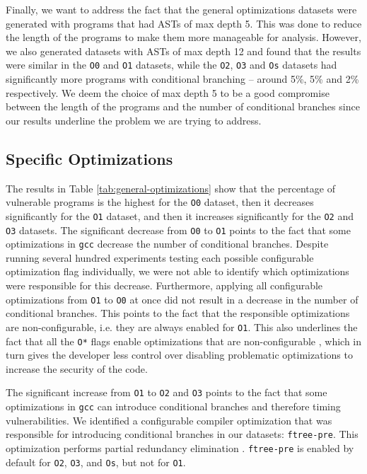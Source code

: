Finally, we want to address the fact that the general optimizations datasets were generated with programs that had ASTs of max depth 5.
This was done to reduce the length of the programs to make them more manageable for analysis.
However, we also generated datasets with ASTs of max depth 12 and found that the results were similar in the \texttt{O0} and \texttt{O1} datasets, while the \texttt{O2}, \texttt{O3} and \texttt{Os} datasets had significantly more programs with conditional branching -- around 5\%, 5\% and 2\% respectively.
We deem the choice of max depth 5 to be a good compromise between the length of the programs and the number of conditional branches since our results underline the problem we are trying to address.

\subsection{Specific Optimizations}
\label{sec:specific-optimizations}
The results in Table \ref{tab:general-optimizations} show that the percentage of vulnerable programs is the highest for the \texttt{O0} dataset, then it decreases significantly for the \texttt{O1} dataset, and then it increases significantly for the \texttt{O2} and \texttt{O3} datasets.
The significant decrease from \texttt{O0} to \texttt{O1} points to the fact that some optimizations in \texttt{gcc} decrease the number of conditional branches. 
Despite running several hundred experiments testing each possible configurable optimization flag \citep{gcc-manual} individually, we were not able to identify which optimizations were responsible for this decrease.
Furthermore, applying all configurable optimizations from \texttt{O1} to \texttt{O0} at once did not result in a decrease in the number of conditional branches.
This points to the fact that the responsible optimizations are non-configurable, i.e. they are always enabled for \texttt{O1}.
This also underlines the fact that all the \texttt{O*} flags enable optimizations that are non-configurable \citep{gcc-manual}, which in turn gives the developer less control over disabling problematic optimizations to increase the security of the code.

The significant increase from \texttt{O1} to \texttt{O2} and \texttt{O3} points to the fact that some optimizations in \texttt{gcc} can introduce conditional branches and therefore timing vulnerabilities. 
We identified a configurable compiler optimization that was responsible for introducing conditional branches in our datasets: \texttt{ftree-pre}.
This optimization performs partial redundancy elimination \citep{gcc-manual}.
\texttt{ftree-pre} is enabled by default for \texttt{O2}, \texttt{O3}, and \texttt{Os}, but not for \texttt{O1}.

